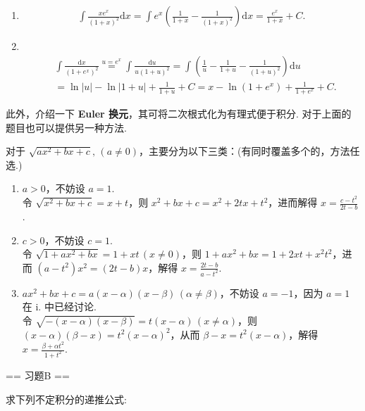 \begin{solution}
\begin{enumerate}
    \item[45.]
    \[
    \begin{aligned}
    \int\frac{xe^x}{(1+x)^2}\mathrm{d}x=\int e^x\left(\frac{1}{1+x}-\frac{1}{(1+x)^2}\right)\mathrm{d}x=\frac{e^x}{1+x}+C.
    \end{aligned}
    \]

    \item[46.]\\
    \[
    \begin{aligned}
    &\int\frac{\mathrm{d}x}{(1+e^x)^2}\overset{u=e^x}{=}\int\frac{\mathrm{d}u}{u(1+u)^2}=\int\left(\frac{1}{u}-\frac{1}{1+u}-\frac{1}{(1+u)^2}\right)\mathrm{d}u\\
    &=\ln\left|u\right|-\ln\left|1+u\right|+\frac{1}{1+u}+C=x-\ln\left(1+e^x\right)+\frac{1}{1+e^x}+C.
    \end{aligned}
    \]
    \end{enumerate}

    此外，介绍一下 \textbf{Euler 换元}，其可将二次根式化为有理式便于积分. 对于上面的题目也可以提供另一种方法.

    对于 $\sqrt{ax^2+bx+c},\,(a\neq 0)$，主要分为以下三类：(有同时覆盖多个的，方法任选.)
    \begin{enumerate}
        \item[i.]$a>0$，不妨设 $a=1$. \\
        令 $\sqrt{x^2+bx+c}=x+t$，则 $x^2+bx+c=x^2+2tx+t^2$，进而解得 $\displaystyle x=\frac{c-t^2}{2t-b}$.
        \item[ii.]$c>0$，不妨设 $c=1$. \\
        令 $\sqrt{1+ax^2+bx}=1+xt\,(x\neq0)$，则 $1+ax^2+bx=1+2xt+x^2t^2$，进而 $(a-t^2)x^2=(2t-b)x$，解得 $\displaystyle x=\frac{2t-b}{a-t^2}$.
        \item[iii.]$ax^2+bx+c=a(x-\alpha)(x-\beta)\,(\alpha\neq\beta)$，不妨设 $a=-1$，因为 $a=1$ 在 i. 中已经讨论. \\
        令 $\sqrt{-(x-\alpha)(x-\beta)}=t(x-\alpha)\,(x\neq \alpha)$，则 $(x-\alpha)(\beta-x)=t^2(x-\alpha)^2$，从而 $\beta-x=t^2(x-\alpha)$，解得 $\displaystyle x=\frac{\beta+\alpha t^2}{1+t^2}$.
    \end{enumerate}
\end{solution}

== 习题B ==

求下列不定积分的递推公式:

